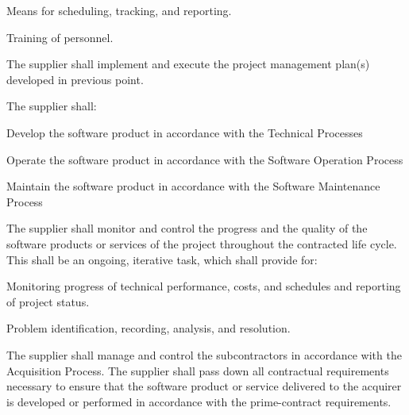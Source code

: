 \begin{adjustwidth}{2em}{0pt}
\begin{compactenum}
\begin{compactenum}
\begin{compactenum}
							\item Means for scheduling, tracking, and reporting.
							
							\item Training of personnel.

						\end{compactenum}

						\item The supplier shall implement and execute the project management plan(s) developed in previous point.

						\item The supplier shall:

						\begin{compactenum}

							\item Develop the software product in accordance with the Technical Processes
							
							\item Operate the software product in accordance with the Software Operation Process

							\item Maintain the software product in accordance with the Software Maintenance Process

						\end{compactenum}

						\item The supplier shall monitor and control the progress and the quality of the software products or services of the project throughout the contracted life cycle. This shall be an ongoing, iterative task, which shall provide for:

						\begin{compactenum}
							
							\item Monitoring progress of technical performance, costs, and schedules and reporting of project status.

							\item Problem identification, recording, analysis, and resolution.

						\end{compactenum}

						\item The supplier shall manage and control the subcontractors in accordance with the Acquisition Process. The supplier shall pass down all contractual requirements necessary to ensure that the software product or service delivered to the acquirer is developed or performed in accordance with the prime-contract requirements.
						

\end{compactenum}
\end{compactenum}
\end{adjustwidth}
